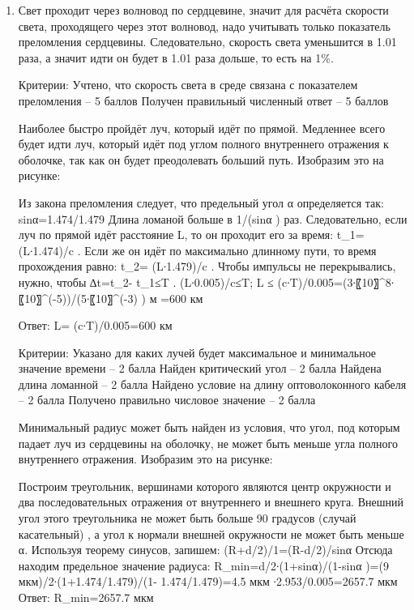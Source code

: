 \solutionSection

\begin{enumerate}
    \item Свет проходит через волновод по сердцевине, значит для расчёта скорости света, проходящего через этот волновод, надо учитывать только показатель преломления сердцевины.  Следовательно, скорость света уменьшится в 1.01 раза, а значит идти он будет в 1.01 раза дольше, то есть на 1\%.
    

Критерии:
	Учтено, что скорость света в среде связана с показателем преломления – 5 баллов
	Получен правильный численный ответ – 5 баллов

	Наиболее быстро пройдёт луч, который идёт по прямой. Медленнее всего будет идти луч, который идёт под углом полного внутреннего отражения к оболочке, так как он будет преодолевать больший путь. Изобразим это на рисунке:
 
Из закона преломления следует, что предельный угол α определяется так:
sin⁡α=1.474/1.479
Длина ломаной больше в 1/(sin⁡α ) раз. Следовательно, если луч по прямой идёт расстояние L, то он проходит его за время:   t_1=  (L∙1.474)/c . Если же он идёт по максимально длинному пути, то время прохождения равно:  t_2=  (L∙1.479)/c .
Чтобы импульсы не перекрывались, нужно, чтобы ∆t=t_2- t_1≤T .
(L∙0.005)/c≤T;  L ≤  (c∙T)/0.005=(3∙〖10〗^8∙〖10〗^(-5))/(5∙〖10〗^(-3) ) м =600 км

Ответ: L=  (c∙T)/0.005=600 км

Критерии: 
	Указано для каких лучей будет максимальное и минимальное значение времени – 2 балла
	Найден критический угол – 2 балла
	Найдена длина ломанной – 2 балла
	Найдено условие на длину оптоволоконного кабеля – 2 балла
	Получено правильно числовое значение – 2 балла

	Минимальный радиус может быть найден из условия, что угол, под которым падает луч из сердцевины на оболочку, не может быть меньше угла полного внутреннего отражения. Изобразим это на рисунке:
  
Построим треугольник, вершинами которого являются центр окружности и два последовательных отражения от внутреннего и внешнего круга. Внешний угол этого треугольника не может быть больше 90 градусов (случай касательный) , а угол к нормали внешней окружности не может быть меньше α. Используя теорему синусов, запишем: 
(R+d/2)/1=(R-d/2)/sin⁡α  
Отсюда находим предельное значение радиуса:
R_min=d/2∙(1+sin⁡α)/(1-sin⁡α )=(9 мкм)/2∙(1+1.474/1.479)/(1- 1.474/1.479)=4.5 мкм ∙2.953/0.005=2657.7 мкм 
Ответ: R_min=2657.7 мкм 


\end{enumerate}
